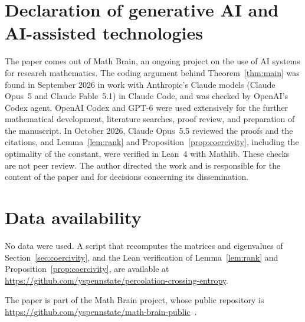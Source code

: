 \documentclass[11pt]{amsart}
\theoremstyle{remark}
\begin{document}
\section*{Declaration of generative AI and AI-assisted technologies}
The paper comes out of Math Brain, an ongoing project on the use of AI systems for research mathematics. The coding argument behind Theorem~\ref{thm:main} was found in September 2026 in work with Anthropic's Claude models (Claude Opus~5 and Claude Fable~5.1) in Claude Code, and was checked by OpenAI's Codex agent. OpenAI Codex and GPT-6 were used extensively for the further mathematical development, literature searches, proof review, and preparation of the manuscript. In October 2026, Claude Opus~5.5 reviewed the proofs and the citations, and Lemma~\ref{lem:rank} and Proposition~\ref{prop:coercivity}, including the optimality of the constant, were verified in Lean~4 with Mathlib. These checks are not peer review. The author directed the work and is responsible for the content of the paper and for decisions concerning its dissemination.

\section*{Data availability}
No data were used. A script that recomputes the matrices and eigenvalues of Section~\ref{sec:coercivity}, and the Lean verification of Lemma~\ref{lem:rank} and Proposition~\ref{prop:coercivity}, are available at \url{https://github.com/yspennstate/percolation-crossing-entropy}.

The paper is part of the Math Brain project, whose public repository is \url{https://github.com/yspennstate/math-brain-public}~\cite{MathBrainRepo}.
\end{document}
